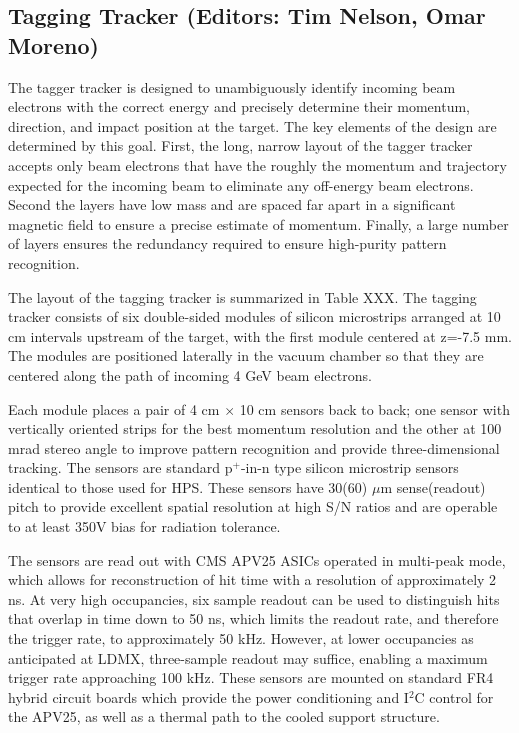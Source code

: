 \subsection{Tagging Tracker (Editors: Tim Nelson, Omar Moreno)}

The tagger tracker is designed to unambiguously identify incoming beam electrons with the correct energy and precisely determine their momentum, direction, and impact position at the target.  The key elements of the design are determined by this goal.  First, the long, narrow layout of the tagger tracker accepts only beam electrons that have the roughly the momentum and trajectory expected for the incoming beam to eliminate any off-energy beam electrons.  Second the layers have low mass and are spaced far apart in a significant magnetic field to ensure a precise estimate of momentum.  Finally, a large number of layers ensures the redundancy required to ensure high-purity pattern recognition. 

The layout of the tagging tracker is summarized in Table XXX. The tagging tracker consists of six double-sided modules of silicon microstrips arranged at 10 cm intervals upstream of the target, with the first module centered at z=-7.5 mm.  The modules are positioned laterally in the vacuum chamber so that they are centered along the path of incoming 4 GeV beam electrons.

Each module places a pair of 4 cm $\times$ 10 cm sensors back to back; one sensor with vertically oriented strips for the best momentum resolution and the other at 100 mrad stereo angle to improve pattern recognition and provide three-dimensional tracking. The sensors are standard p$^+$-in-n type silicon microstrip sensors identical to those used for HPS.  These sensors have 30(60) $\mu$m sense(readout) pitch to provide excellent spatial resolution at high S/N ratios and are operable to at least 350V bias for radiation tolerance.

The sensors are read out with CMS APV25 ASICs operated in multi-peak mode, which allows for reconstruction of hit time with a resolution of approximately 2 ns. At very high occupancies, six sample readout can be used to distinguish hits that overlap in time down to 50 ns, which limits the readout rate, and therefore the trigger rate, to approximately 50 kHz.  However, at lower occupancies as anticipated at LDMX, three-sample readout may suffice, enabling a maximum trigger rate approaching 100 kHz.  These sensors are mounted on standard FR4 hybrid circuit boards which provide the power conditioning and I$^2$C control for the APV25, as well as a thermal path to the cooled support structure.

